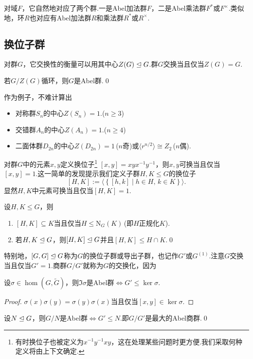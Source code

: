 对域$F$，它自然地对应了两个群.一是Abel加法群$F$，二是Abel乘法群$F^*$或$F^\times$.类似地，环$R$也对应有Abel加法群$R$和乘法群$R^*$或$R^\times$.
\subsection{换位子群}
对群$G$，它交换性的衡量可以用其中心$Z(G)\trianglelefteq G$.群$G$交换当且仅当$Z(G)=G$.
\begin{prop}
	若$G/Z(G)$循环，则$G$是Abel群.\qed
\end{prop}

作为例子，不难计算出
\begin{itemize}
	\item 对称群$S_n$的中心$Z(S_n)=1$.($n\ge 3$)
	\item 交错群$A_n$的中心$Z(A_n)=1$.($n\ge 4$)
	\item 二面体群$D_{2n}$的中心$Z(D_{2n})=1$\,($n$奇)或$\langle r^{n/2}\rangle \cong Z_2$\,($n$偶).
\end{itemize}

对群$G$中的元素$x,y$定义{\heiti 换位子}\footnote{有时换位子也被定义为$x^{-1}y^{-1}xy$，这在处理某些问题时更方便.我们采取何种定义将由上下文确定.} $[x,y]=xyx^{-1}y^{-1}$，则$x,y$可换当且仅当$[x,y]=1$.这一简单的发现提示我们定义子群$H,K\le G$的{\heiti 换位子}
\[
	[H,K]:=\langle \left\{[h,k]\mid h\in H,\,k\in K\right\}\rangle .
\]
显然$H,K$中元素可换当且仅当$[H,K]=1$.
\begin{lemma}
	设$H,K\le G$，则
	\begin{enumerate}
		\item $[H,K]\subseteq K$当且仅当$H\le\mathrm{N}_G(K)$\,(即$H$正规化$K$).
		\item 若$H,K\trianglelefteq G$，则$[H,K]\trianglelefteq G$并且$[H,K]\le H\cap K$.\qed
	\end{enumerate}
\end{lemma}

特别地，$[G,G]\trianglelefteq G$称为$G$的{\heiti 换位子群}或{\heiti 导出子群}，也记作$G'$或$G^{(1)}$.注意$G$交换当且仅当$G'=1$.商群$G/G'$就称为$G$的{\heiti 交换化}，因为\hypertarget{text:Abelianization}{}
\begin{prop}
	设$\sigma\in\hom(G,\tilde{G})$，则$\Im\sigma$是Abel群$\iff G'\le\ker\sigma$.
\end{prop}
\begin{proof}
	$\sigma(x)\sigma(y)=\sigma(y)\sigma(x)$当且仅当$[x,y]\in\ker\sigma$.
\end{proof}
\begin{cor*}
	设$N\trianglelefteq G$，则$G/N$是Abel群$\iff G'\le N$.即$G/G'$是最大的Abel商群.\qed
\end{cor*}

